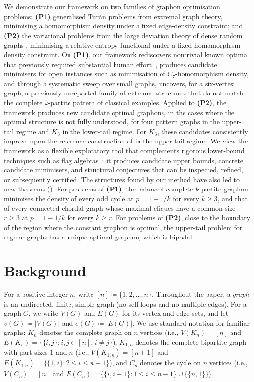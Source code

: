 \documentclass[11pt]{article}
\theoremstyle{plain}
\theoremstyle{definition}
\theoremstyle{remark}
\begin{document}
We demonstrate our framework on two families of graphon optimisation problems: \textbf{(P1)} generalised Tur\'an problems from extremal graph theory, minimising a homomorphism density under a fixed edge-density constraint; and \textbf{(P2)} the variational problems from the large deviation theory of dense random graphs \citep{chatterjee2011large}, minimising a relative-entropy functional under a fixed homomorphism-density constraint.
On \textbf{(P1)}, our framework rediscovers nontrivial known optima that previously required substantial human effort~\citep{goodman1959sets,bollobas1976relations,lovasz1983number,fisher1989lower,razborov2008minimal}, produces candidate minimisers for open instances such as minimisation of $C_7$-homomorphism density, and through a systematic sweep over small graphs, uncovers, for a six-vertex graph, a previously unreported family of extremal structures that do not match the complete $k$-partite pattern of classical examples.
Applied to \textbf{(P2)}, the framework produces new candidate optimal graphons, in the cases where the optimal structure is not fully understood, for four pattern graphs in the upper-tail regime and $K_3$ in the lower-tail regime. For $K_3$, these candidates consistently improve upon the reference construction of \citet{lubetzky2015replica} in the upper-tail regime.
We view the framework as a flexible exploratory tool that complements rigorous lower-bound techniques such as flag algebras~\citep{razborov2007flag,falgas2013applications}: it produces candidate upper bounds, concrete candidate minimisers, and structural conjectures that can be inspected, refined, or subsequently certified. The structures found by our method have also led to new theorems (). For problems of \textbf{(P1)}, the balanced complete $k$-partite graphon minimises the density of every odd cycle at $p = 1 - 1/k$ for every $k \ge 3$, and that of every connected chordal graph whose maximal cliques have a common size $r \ge 3$ at $p = 1 - 1/k$ for every $k \ge r$. For problems of \textbf{(P2)}, close to the boundary of the region where the constant graphon is optimal, the upper-tail problem for regular graphs has a unique optimal graphon, which is bipodal.

\section{Background} \label{sec:background}

For a positive integer $n$, write $[n] \coloneqq \{1,2,\ldots,n\}$. Throughout the paper, a \emph{graph} is an undirected, finite, simple graph (no self-loops and no multiple edges). For a graph $G$, we write $V(G)$ and $E(G)$ for its vertex and edge sets, and let $v(G) \coloneqq |V(G)|$ and $e(G) \coloneqq |E(G)|$. We use standard notation for familiar graphs: $K_n$ denotes the complete graph on $n$ vertices (i.e., $V(K_n) = [n]$ and $E(K_n) = \{\{i,j\} : i, j \in [n],\, i \neq j\}$), $K_{1,n}$ denotes the complete bipartite graph with part sizes $1$ and $n$ (i.e., $V(K_{1,n}) = [n+1]$ and $E(K_{1,n}) = \{\{1,i\} : 2\le i\le n+1\}$), and $C_n$ denotes the cycle on $n$ vertices (i.e., $V(C_n) = [n]$ and $E(C_n) = \{\{i,i+1\} : 1\le i\le n-1\} \cup \{\{n,1\}\}$).
\end{document}
